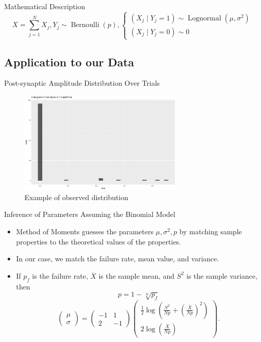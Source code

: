 \documentclass{beamer}
\DeclareMathOperator{\Bernoulli}{Bernoulli}
\DeclareMathOperator{\Lognormal}{Lognormal}
\begin{document}
\begin{frame}{Mathematical Description}
  \[
    X = \sum_{j=1}^N X_j, Y_j\sim\Bernoulli(p), 
    \begin{cases}
      (X_j\mid Y_j = 1)\sim\Lognormal(\mu, \sigma^2) \\ 
      (X_j\mid Y_j = 0)\sim0
    \end{cases}
  \]
\end{frame}

\subsection{Application to our Data}

\begin{frame}{Post-synaptic Amplitude Distribution Over Trials}
  \begin{figure}
    \centering
    \includegraphics[width = 0.7\textwidth]{./histogram.pdf}
    \caption{Example of observed distribution}
  \end{figure}
\end{frame}

\begin{frame}{Inference of Parameters Assuming the Binomial Model}
  \begin{itemize}
    \item Method of Moments guesses the parameters $\mu, \sigma^2, p$ by matching sample properties to the theoretical values of the properties. 
    \item In our case, we match the failure rate, mean value, and variance. 
    \item If $p_f$ is the failure rate, $\overline X$ is the sample mean, and $S^2$ is the sample variance, then
    \[
      p = 1 - \sqrt[N]{p_f}
    \]
    \[
      \begin{pmatrix}\mu\\\sigma\end{pmatrix} = \begin{pmatrix}-1&1\\2&-1\end{pmatrix}\begin{pmatrix}\frac12\log\left(\frac{S^2}{Np} + \left(\frac{\overline X}{Np}\right)^2\right)\\2\log\left(\frac{\overline X}{Np}\right)\end{pmatrix}. 
    \]
  \end{itemize}
\end{frame}
\end{document}
